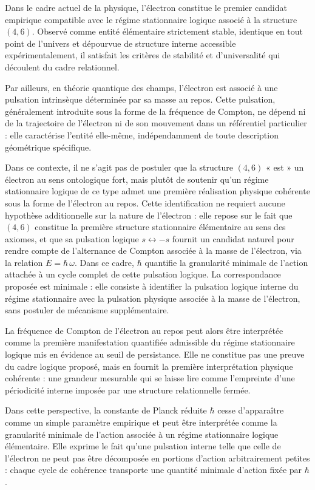 \documentclass[11pt,a4paper]{article}
\begin{document}
Dans le cadre actuel de la physique, l’électron constitue le premier candidat empirique compatible avec le régime stationnaire logique associé à la structure \(\left(4,6\right)\). Observé comme entité élémentaire strictement stable, identique en tout point de l’univers et dépourvue de structure interne accessible expérimentalement, il satisfait les critères de stabilité et d’universalité qui découlent du cadre relationnel.

Par ailleurs, en théorie quantique des champs, l’électron est associé à une pulsation intrinsèque déterminée par sa masse au repos. Cette pulsation, généralement introduite sous la forme de la fréquence de Compton, ne dépend ni de la trajectoire de l’électron ni de son mouvement dans un référentiel particulier : elle caractérise l’entité elle-même, indépendamment de toute description géométrique spécifique.

Dans ce contexte, il ne s’agit pas de postuler que la structure \(\left(4,6\right)\) « est » un électron au sens ontologique fort, mais plutôt de soutenir qu’un régime stationnaire logique de ce type admet une première réalisation physique cohérente sous la forme de l’électron au repos. Cette identification ne requiert aucune hypothèse additionnelle sur la nature de l’électron : elle repose sur le fait que \(\left(4,6\right)\) constitue la première structure stationnaire élémentaire au sens des axiomes, et que sa pulsation logique \(s \leftrightarrow -s\) fournit un candidat naturel pour rendre compte de l’alternance de Compton associée à la masse de l’électron, via la relation \(E = \hbar \,\omega\). Dans ce cadre, \(\hbar\) quantifie la granularité minimale de l’action attachée à un cycle complet de cette pulsation logique. La correspondance proposée est minimale : elle consiste à identifier la pulsation logique interne du régime stationnaire avec la pulsation physique associée à la masse de l’électron, sans postuler de mécanisme supplémentaire.

La fréquence de Compton de l’électron au repos peut alors être interprétée comme la première manifestation quantifiée admissible du régime stationnaire logique mis en évidence au seuil de persistance. Elle ne constitue pas une preuve du cadre logique proposé, mais en fournit la première interprétation physique cohérente : une grandeur mesurable qui se laisse lire comme l’empreinte d’une périodicité interne imposée par une structure relationnelle fermée.

Dans cette perspective, la constante de Planck réduite \(\hbar\) cesse d’apparaître comme un simple paramètre empirique et peut être interprétée comme la granularité minimale de l’action associée à un régime stationnaire logique élémentaire. Elle exprime le fait qu’une pulsation interne telle que celle de l’électron ne peut pas être décomposée en portions d’action arbitrairement petites : chaque cycle de cohérence transporte une quantité minimale d’action fixée par \(\hbar\).
\end{document}
